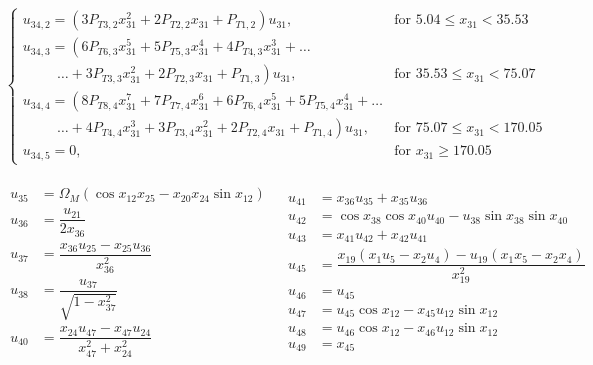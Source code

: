 \begin{equation}
\begin{split}
\begin{cases}
u_{34,2}=\left(3P_{T 3,2}x_{31}^{2}+2P_{T 2,2}x_{31}+P_{T 1,2}\right)u_{31}, &  \text{for } 5.04\leq x_{31} < 35.53   \\
u_{34,3}=\left(6 P_{T 6,3}x_{31}^{5}+5P_{T 5,3}x_{31}^{4}+4P_{T 4,3}x_{31}^{3}+\dots \right. \\
\qquad \ \  \left. \dotsc +3P_{T 3,3}x_{31}^{2}+2P_{T 2,3}x_{31}+P_{T 1,3}\right)u_{31}, &  \text{for } 35.53\leq x_{31} < 75.07   \\
u_{34,4}=\left(8 P_{T 8,4}x_{31}^{7}+7P_{T 7,4}x_{31}^{6}+6P_{T 6,4}x_{31}^{5}+5P_{T 5,4}x_{31}^{4} + \dots \right. \\
\qquad \ \  \left. \dotsc +4P_{T 4,4}x_{31}^{3}+3P_{T 3,4}x_{31}^{2}+2P_{T 2,4}x_{31}+P_{T 1,4}\right)u_{31}, &  \text{for } 75.07\leq x_{31} < 170.05   \\
u_{34,5}=0, &  \text{for }  x_{31} \geq 170.05   
\end{cases}
\end{split}
\end{equation}

\begin{align} \label{eq:unAuxEq3}
\begin{split}
u_{35} &=  \Omega_{M}\left(\cos x_{12}x_{25}-x_{20}x_{24}\sin x_{12}\right) \\
u_{36} &=  \dfrac{u_{21}}{2x_{36}} \\
u_{37} &= \dfrac{x_{36}u_{25}-x_{25}u_{36}}{x_{36}^{2}} \\
u_{38} &= \dfrac{u_{37}}{\sqrt{1-x_{37}^{2}}} \\ 
u_{40} &=  \dfrac{x_{24}u_{47}-x_{47}u_{24}}{x_{47}^{2}+x_{24}^{2}}\\
\end{split}
&
\begin{split}
u_{41} &= x_{36}u_{35}+x_{35}u_{36}\\ 
u_{42} &= \cos x_{38} \cos x_{40} u_{40}-u_{38} \sin x_{38} \sin x_{40}\\
u_{43} &= x_{41}u_{42}+x_{42}u_{41} \\ 
u_{45} &= \dfrac{x_{19}\left(x_{1}u_{5}-x_{2}u_{4}\right)-u_{19}\left(x_{1}x_{5}-x_{2}x_{4}\right)}{x_{19}^{2}}\\
u_{46} &= u_{45} \\
u_{47} &= u_{45}\cos x_{12} - x_{45}u_{12}\sin x_{12} \\
u_{48} &= u_{46}\cos x_{12} - x_{46}u_{12}\sin x_{12} \\
u_{49} &= x_{45}\\
\end{split}
\end{align}

